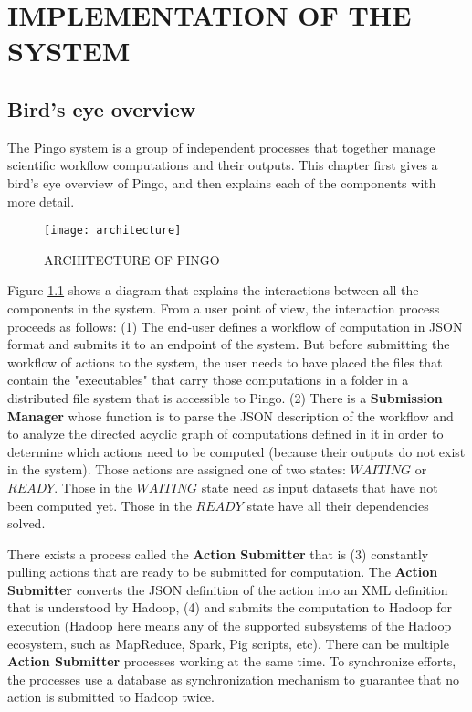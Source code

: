 \chapter{IMPLEMENTATION OF THE SYSTEM}
\label{chap:implementation}
\section{Bird's eye overview}
The Pingo system is a group of independent processes that together manage scientific workflow computations and their outputs.  This chapter first gives a bird's eye overview of Pingo, and then explains each of the components with more detail. 


\begin{figure}
\centering
\texttt{[image: architecture]}
\caption{ARCHITECTURE OF PINGO}
\label{fig:workflow_flow}
\end{figure}
Figure \ref{fig:workflow_flow} shows a diagram that explains the interactions between all the components in the system. From a user point of view, the interaction process proceeds as follows: (1) The end-user defines a workflow of computation in JSON format and submits it to an endpoint of the system. But before submitting the workflow of actions to the system, the user needs to have placed the files that contain the "executables" that carry those computations in a folder in a distributed file system that is accessible to Pingo. (2) There is a \textbf{Submission Manager} whose function is to parse the JSON description of the workflow and to analyze the directed acyclic graph of computations defined in it in order to determine which actions need to be computed (because their outputs do not exist in the system). Those actions are assigned one of two states: $WAITING$ or $READY$. Those in the $WAITING$ state need as input datasets that have not been computed yet.  Those in the $READY$ state have all their dependencies solved.

There exists a process called the \textbf{Action Submitter} that is (3) constantly pulling actions that are ready to be submitted for computation. The \textbf{Action Submitter} converts the JSON definition of the action into an XML definition that is understood by Hadoop, (4) and submits the computation to Hadoop for execution (Hadoop here means any of the supported subsystems of the Hadoop ecosystem, such as MapReduce, Spark, Pig scripts, etc). There can be multiple \textbf{Action Submitter} processes working at the same time.  To synchronize efforts, the processes use a database as synchronization mechanism to guarantee that no action is submitted to Hadoop twice.

